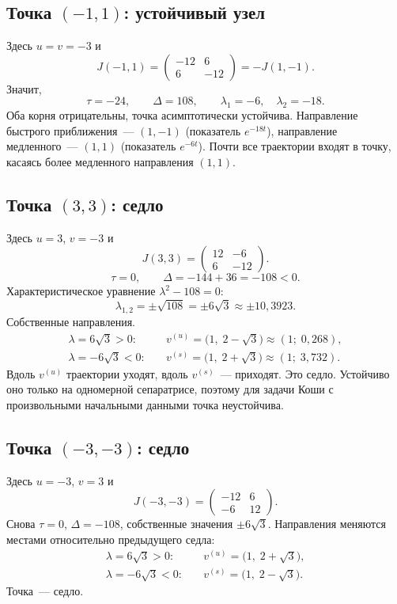 \documentclass[12pt,a4paper]{article}
\begin{document}
\subsection{Точка \((-1,1)\): устойчивый узел}

Здесь \(u = v = -3\) и
\[
J(-1,1) =
\begin{pmatrix} -12 & 6 \\ 6 & -12 \end{pmatrix}
= -J(1,-1).
\]
Значит,
\[
\tau = -24, \qquad \Delta = 108, \qquad \lambda_1 = -6, \quad \lambda_2 = -18.
\]
Оба корня отрицательны, точка асимптотически устойчива. Направление быстрого приближения~--- \((1,-1)\) (показатель \(e^{-18t}\)), направление медленного~--- \((1,1)\) (показатель \(e^{-6t}\)). Почти все траектории входят в точку, касаясь более медленного направления \((1,1)\).

\subsection{Точка \((3,3)\): седло}

Здесь \(u = 3\), \(v = -3\) и
\[
J(3,3) =
\begin{pmatrix} 12 & -6 \\ 6 & -12 \end{pmatrix}.
\]
\[
\tau = 0, \qquad \Delta = -144 + 36 = -108 < 0.
\]
Характеристическое уравнение \(\lambda^2 - 108 = 0\):
\[
\lambda_{1,2} = \pm\sqrt{108} = \pm 6\sqrt{3} \approx \pm 10{,}3923.
\]
Собственные направления.
\begin{align*}
\lambda = 6\sqrt{3} > 0:&\quad
v^{(u)} = \bigl(1,\; 2-\sqrt{3}\bigr) \approx (1;\; 0{,}268),\\
\lambda = -6\sqrt{3} < 0:&\quad
v^{(s)} = \bigl(1,\; 2+\sqrt{3}\bigr) \approx (1;\; 3{,}732).
\end{align*}
Вдоль \(v^{(u)}\) траектории уходят, вдоль \(v^{(s)}\)~--- приходят. Это седло. Устойчиво оно только на одномерной сепаратрисе, поэтому для задачи Коши с произвольными начальными данными точка неустойчива.

\subsection{Точка \((-3,-3)\): седло}

Здесь \(u = -3\), \(v = 3\) и
\[
J(-3,-3) =
\begin{pmatrix} -12 & 6 \\ -6 & 12 \end{pmatrix}.
\]
Снова \(\tau = 0\), \(\Delta = -108\), собственные значения \(\pm 6\sqrt{3}\). Направления меняются местами относительно предыдущего седла:
\begin{align*}
\lambda = 6\sqrt{3} > 0:&\quad
v^{(u)} = \bigl(1,\; 2+\sqrt{3}\bigr),\\
\lambda = -6\sqrt{3} < 0:&\quad
v^{(s)} = \bigl(1,\; 2-\sqrt{3}\bigr).
\end{align*}
Точка~--- седло.
\end{document}
